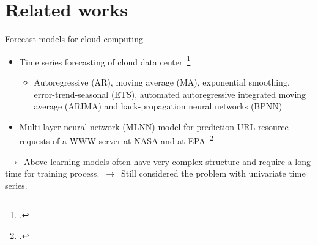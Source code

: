 \documentclass{beamer}
\begin{document}
\section{Related works}
\begin{frame}{Forecast models for cloud computing}
	\begin{itemize}
			\item{
				Time series forecasting of cloud data center~\footcite{Hipel et al. 1994}
				}
				\begin{itemize}
					\item {
						Autoregressive (AR), moving average (MA), exponential smoothing, error-trend-seasonal (ETS), automated autoregressive integrated moving average (ARIMA) and back-propagation neural networks (BPNN)  
					}
				\end{itemize}	

			\item {
	 			Multi-layer neural network (MLNN) model for prediction URL resource requests of a WWW server at NASA and at EPA~\footcite{Prevost et al. 2011}  
			}
	\end{itemize}
	\vspace{0.3cm}
		$\,\to\,$ Above learning models often have very complex structure and require a long time for training process.\newline
		$\,\to\,$ Still considered the problem with univariate time series.

\end{frame}
\end{document}
